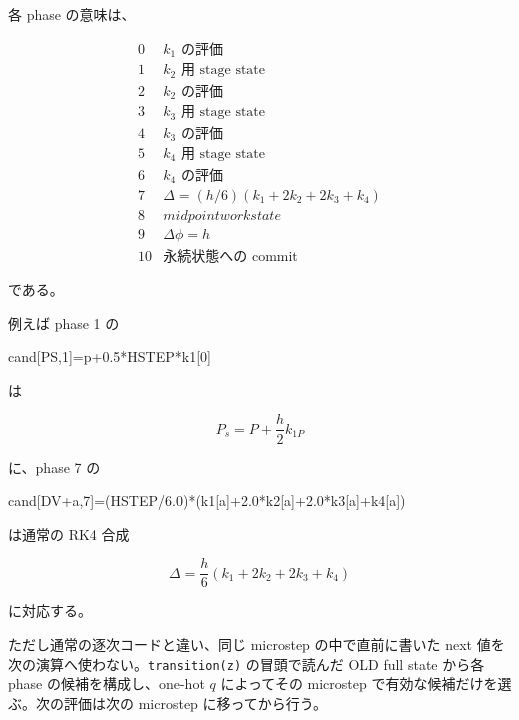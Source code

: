 \documentclass[
  a4paper,
]{ltjsarticle}
\newenvironment{Shaded}{}{}
\newcommand{\DecValTok}[1]{\textcolor[rgb]{0.25,0.63,0.44}{#1}}
\newcommand{\FloatTok}[1]{\textcolor[rgb]{0.25,0.63,0.44}{#1}}
\newcommand{\NormalTok}[1]{#1}
\newcommand{\OperatorTok}[1]{\textcolor[rgb]{0.40,0.40,0.40}{#1}}
\begin{document}
各 phase の意味は、

\[
\begin{array}{c|l}
0 & k_1\text{ の評価}\\
1 & k_2\text{ 用 stage state}\\
2 & k_2\text{ の評価}\\
3 & k_3\text{ 用 stage state}\\
4 & k_3\text{ の評価}\\
5 & k_4\text{ 用 stage state}\\
6 & k_4\text{ の評価}\\
7 & \Delta=(h/6)(k_1+2k_2+2k_3+k_4)\\
8 & midpoint work state\\
9 & \Delta\phi=h\\
10 & \text{永続状態への commit}
\end{array}
\]

である。

例えば phase 1 の

\begin{Shaded}
\begin{Highlighting}[]
\NormalTok{cand[PS,}\DecValTok{1}\NormalTok{]}\OperatorTok{=}\NormalTok{p}\OperatorTok{+}\FloatTok{0.5}\OperatorTok{*}\NormalTok{HSTEP}\OperatorTok{*}\NormalTok{k1[}\DecValTok{0}\NormalTok{]}
\end{Highlighting}
\end{Shaded}

は

\[
P_s=P+\frac{h}{2}k_{1P}
\]

に、phase 7 の

\begin{Shaded}
\begin{Highlighting}[]
\NormalTok{cand[DV}\OperatorTok{+}\NormalTok{a,}\DecValTok{7}\NormalTok{]}\OperatorTok{=}\NormalTok{(HSTEP}\OperatorTok{/}\FloatTok{6.0}\NormalTok{)}\OperatorTok{*}\NormalTok{(k1[a]}\OperatorTok{+}\FloatTok{2.0}\OperatorTok{*}\NormalTok{k2[a]}\OperatorTok{+}\FloatTok{2.0}\OperatorTok{*}\NormalTok{k3[a]}\OperatorTok{+}\NormalTok{k4[a])}
\end{Highlighting}
\end{Shaded}

は通常の RK4 合成

\[
\Delta
=
\frac{h}{6}
\left(k_1+2k_2+2k_3+k_4\right)
\]

に対応する。

ただし通常の逐次コードと違い、同じ microstep の中で直前に書いた next
値を次の演算へ使わない。\texttt{transition(z)} の冒頭で読んだ OLD full
state から各 phase の候補を構成し、one-hot \(q\) によってその microstep
で有効な候補だけを選ぶ。次の評価は次の microstep に移ってから行う。
\end{document}
